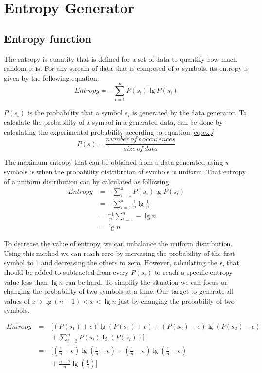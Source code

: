 \section{Entropy Generator}\label{sec:ent_des}
\subsection{Entropy function}\label{sub:func}
The entropy is quantity that is defined for a set of data to quantify how much random it is.
For any stream of data that is composed of $n$ symbols, its entropy is given by the following
equation:
\begin{equation}\label{eq:ent}
Entropy = -\sum_{i=1}^n P(s_i)\lg P(s_i)
\end{equation}

$P(s_i)$ is the probability that a symbol $s_i$ is generated by the data generator.
To calculate the probability of a symbol in a generated data, can be done by calculating
the experimental probability according to equation \ref{eq:exp}
\begin{equation}\label{eq:exp}
P(s) = \frac{number\, of\, s\, occurences}{size\, of\, data}
\end{equation}

The maximum entropy that can be obtained from a data generated using $n$ symbols is when the
probability distribution of symbols is uniform. That entropy of a uniform distribution can by calculated as following
\begin{align}
Entropy &= -\sum_{i=1}^n P(s_i)\lg P(s_i) \nonumber \\
        &= -\sum_{i=1}^n \frac{1}{n} \lg \frac{1}{n} \nonumber \\
        &= \frac{-1}{n}\sum_{i=1}^n -\lg n \nonumber \\
        &= \lg n 
\end{align}

To decrease the value of entropy, we can imbalance the uniform distribution. Using this method we can reach zero by increasing the probability of the first symbol to 1 and decreasing the
others to zero. However, calculating the $\epsilon_i$ that should be added to subtracted from every $P(s_i)$
to reach a specific entropy value less than $\lg n$ can be hard. To simplify the situation we 
can focus on changing the probability of two symbols at a time.
Our target to generate all values of $x \ni \lg(n-1)<x<\lg n$ just by changing the probability of two symbols.

\begin{align}
Entropy &= -[(P(s_1)+\epsilon)\lg (P(s_1)+\epsilon) + (P(s_2)-\epsilon)\lg (P(s_2)-\epsilon)\nonumber \\
        &\qquad{} +  \sum_{i=3}^n P(s_i)\lg (P(s_i))]\label{eq:imb_ent}\\
 &= -[(\frac{1}{n}+\epsilon)\lg (\frac{1}{n}+\epsilon) + (\frac{1}{n}-\epsilon)\lg (\frac{1}{n}-\epsilon) \nonumber \\
      &\qquad  +  \frac{n-2}{n}\lg (\frac{1}{n})]\label{eq:imb_ent2}
\end{align}


